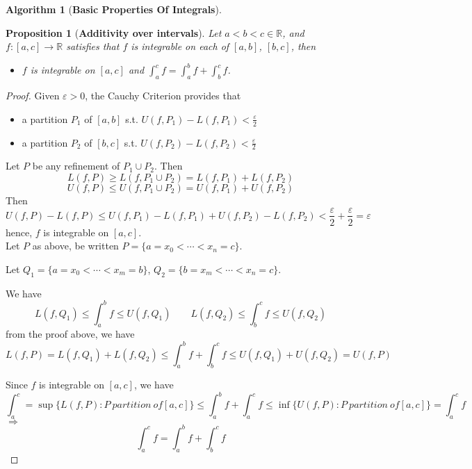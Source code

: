 \documentclass[12pt]{article}
\theoremstyle{plain}
\newtheorem{proposition}{Proposition}[subsection]
\newtheorem{algorithm}{Algorithm}[subsection]
\newcommand{\ep}{\varepsilon}
\begin{document}
	\begin{algorithm}[\textbf{Basic Properties Of Integrals}]
			
	\end{algorithm}

	\begin{proposition}[\textbf{Additivity over intervals}]
		Let $a<b<c \in \mathbb{R}$, and $f:[a,c] \to \mathbb{R}$ satisfies
		that $f$ is integrable on each of $[a,b]$, $[b,c]$, then 
		\begin{itemize}
			\item $f$ is integrable on $[a,c]$ and  
				$\int_a^c f = \int_a^b f+\int_b^c f$.
						\end{itemize}
	\end{proposition}
	\begin{proof}
		Given $\ep > 0$, the Cauchy Criterion provides that 
		\begin{itemize}
			\item a partition $P_1$ of $[a,b]$ s.t. 
				$U(f,P_1) - L(f,P_1) < \frac{\ep}2$
			\item a partition $P_2$ of $[b,c]$ s.t. 
				$U(f,P_2) - L(f,P_2) < \frac{\ep}2$
		\end{itemize}
		Let $P$ be any refinement of $P_1\cup P_2$. Then 
		\[
			L(f,P)\geq L(f,P_1\cup P_2) = L(f,P_1) + L(f,P_2)
		\]
		\[
			U(f,P)\leq U(f,P_1\cup P_2) = U(f,P_1) + U(f,P_2)
		\]
		Then
		\[
			U(f,P)-L(f,P) \leq U(f,P_1) - L(f,P_1) +U(f,P_2) - L(f,P_2)
			<\frac{\ep}2+\frac{\ep}2 = \ep
		\]
		hence, $f$ is integrable on $[a,c]$. \\
		
		Let $P$ as above, be written $P = \{a = x_0 < \cdots < x_n = c\}$.
		
		Let $Q_1 = \{a=x_0<\cdots<x_m = b\}$, $Q_2 = \{b = x_m <\cdots<x_n=c\}$.
		
		We have 
		\[
			L(f,Q_1) \leq \int_a^b f \leq U(f,Q_1) \qquad 
			L(f,Q_2) \leq \int_b^c f \leq U(f,Q_2)
		\]
		from the proof above, we have 
		\[
			L(f,P) = L(f,Q_1)+L(f,Q_2)\leq \int_a^b f + \int_b^c f
			\leq U(f,Q_1) + U(f,Q_2) = U(f,P)
		\]
	
		Since $f$ is integrable on $[a,c]$, we have
		\[
			\int_a^c = \sup\{L(f,P):P \ partition \ of [a,c] \}
			\leq \int_a^b f + \int_a^c f \leq \inf\{U(f,P): P\ partition
			\ of [a,c]\} = \int_a^c f
		\]
		$\Rightarrow$
		\[
			\int_a^c f = \int_a^b f + \int_b^c f
		\]
	\end{proof}

\end{document}

